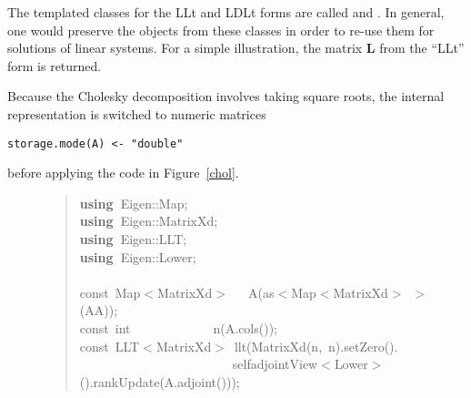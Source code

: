 \documentclass[shortnames,article]{jss}
\newcommand{\hlstd}[1]{\textcolor[rgb]{0,0,0}{#1}}
\newcommand{\hlopt}[1]{\textcolor[rgb]{0,0,0}{#1}}
\newcommand{\hlkwa}[1]{\textcolor[rgb]{0.61,0.13,0.93}{\bf{#1}}}
\newcommand{\hlkwb}[1]{\textcolor[rgb]{0.13,0.54,0.13}{#1}}
\newcommand{\hlkwd}[1]{\textcolor[rgb]{0,0,0}{#1}}
\begin{document}
The templated  classes for the LLt and LDLt forms are
called  and .  In general, one would preserve the
objects from these classes in order to re-use them for solutions of
linear systems.  For a simple illustration, the matrix $\bm L$
from the ``LLt'' form is returned.

Because the Cholesky decomposition involves taking square roots, the internal
representation is switched to numeric matrices
\begin{verbatim}
storage.mode(A) <- "double"
\end{verbatim}
before applying the code in Figure~\ref{chol}.

\begin{figure}[htb]
  \begin{quote}
    \noindent
    \ttfamily
    \hlstd{}\hlkwa{using\ }\hlstd{Eigen}\hlopt{::}\hlstd{Map}\hlopt{;}\hspace*{\fill}\\
    \hlstd{}\hlkwa{using\ }\hlstd{Eigen}\hlopt{::}\hlstd{MatrixXd}\hlopt{;}\hspace*{\fill}\\
    \hlstd{}\hlkwa{using\ }\hlstd{Eigen}\hlopt{::}\hlstd{LLT}\hlopt{;}\hspace*{\fill}\\
    \hlstd{}\hlkwa{using\ }\hlstd{Eigen}\hlopt{::}\hlstd{Lower}\hlopt{;}\hspace*{\fill}\\
    \hlstd{}\hspace*{\fill}\\
    \hlkwb{const\ }\hlstd{Map}\hlopt{$<$}\hlstd{MatrixXd}\hlopt{$>$}\hlstd{\ \ \ }\hlopt{}\hlstd{}\hlkwd{A}\hlstd{}\hlopt{(}\hlstd{as}\hlopt{$<$}\hlstd{Map}\hlopt{$<$}\hlstd{MatrixXd}\hlopt{$>$\ $>$(}\hlstd{AA}\hlopt{));}\hspace*{\fill}\\
    \hlstd{}\hlkwb{const\ int}\hlstd{\ \ \ \ \ \ \ \ \ \ \ \ \ }\hlkwb{}\hlstd{}\hlkwd{n}\hlstd{}\hlopt{(}\hlstd{A}\hlopt{.}\hlstd{}\hlkwd{cols}\hlstd{}\hlopt{());}\hspace*{\fill}\\
    \hlstd{}\hlkwb{const\ }\hlstd{LLT}\hlopt{$<$}\hlstd{MatrixXd}\hlopt{$>$\ }\hlstd{}\hlkwd{llt}\hlstd{}\hlopt{(}\hlstd{}\hlkwd{MatrixXd}\hlstd{}\hlopt{(}\hlstd{n}\hlopt{,\ }\hlstd{n}\hlopt{).}\hlstd{}\hlkwd{setZero}\hlstd{}\hlopt{().}\hspace*{\fill}\\
    \hlstd{}\hlstd{\ \ \ \ \ \ \ \ \ \ \ \ \ \ \ \ \ \ \ \ \ \ \ \ }\hlstd{selfadjointView}\hlopt{$<$}\hlstd{Lower}\hlopt{$>$().}\hlstd{}\hlkwd{rankUpdate}\hlstd{}\hlopt{(}\hlstd{A}\hlopt{.}\hlstd{}\hlkwd{adjoint}\hlstd{}\hlopt{()));}\hspace*{\fill}\\

\end{quote}
\end{figure}
\end{document}
